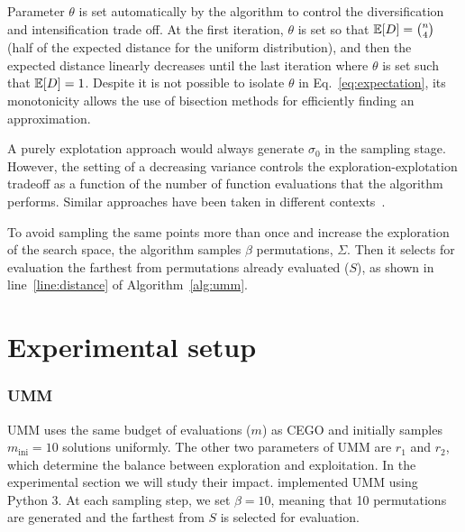 \documentclass[runningheads]{llncs}
\DeclareMathOperator*{\argmax}{arg\,max}
\newcommand{\minit}{\ensuremath{m_\text{ini}}\xspace}
\newcommand{\FEmax}{\ensuremath{m}}
\begin{document}
Parameter $\theta$ is set automatically by the algorithm to control the diversification and intensification trade off. At the first iteration, $\theta$ is set so that  $\mathbb{E}[D] = \binom{n}{4}$ (half of the expected distance for the uniform distribution), and then the expected distance linearly decreases until the last iteration where $\theta$ is set such that $\mathbb{E}[D] = 1$. Despite it is not possible to isolate $\theta$ in Eq.~\eqref{eq:expectation}, its monotonicity allows the use of bisection methods for efficiently finding an approximation. 



A purely explotation approach would always generate $\sigma_0$ in the sampling stage. However, the setting of a decreasing variance   controls the exploration-explotation tradeoff as a function of the number of function evaluations that the algorithm performs.  Similar approaches have been taken in different contexts~\cite{ArzCebPer2019qap}.

To avoid sampling the same points more than once and increase the exploration of the search space, the algorithm samples $\beta$ permutations, $\Sigma$. Then it selects  for evaluation the farthest from permutations already evaluated ($S$), as shown in line~\ref{line:distance} of Algorithm~\ref{alg:umm}.






\section{Experimental setup}\label{sec:setup}

\subsubsection{UMM}
%
UMM uses the same budget of evaluations ($\FEmax$) as CEGO
and initially samples $\minit=10$ solutions uniformly. The other two parameters
of UMM are $r_1$ and $r_2$, which determine the balance between exploration and
exploitation. In the experimental section we will study their impact. implemented UMM using Python 3.
At each sampling step, we set $\beta=10$, meaning that 10 permutations are generated and the farthest from $S$ is selected for evaluation. 
\end{document}
